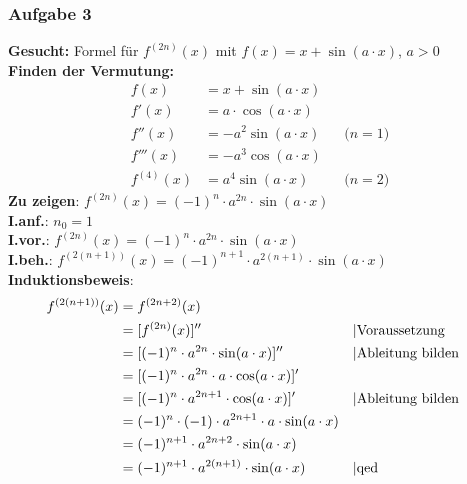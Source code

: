 \subsubsection{Aufgabe 3}
\textbf{Gesucht:} Formel für $ f^{(2n)}(x) $ mit $ f(x)=x+\sin(a\cdot x) $, $a>0$ \\
\textbf{Finden der Vermutung:}\begin{align*} 	
f(x) &= x+\sin(a\cdot x) \\
f'(x) &= a\cdot \cos(a\cdot x)\\
f''(x) &= -a^2\sin(a\cdot x)&&\text{($n=1$)}\\
f'''(x) &= -a^3 \cos(a\cdot x) \\
f^{(4)}(x) &= a^4\sin (a\cdot x)&&\text{($n=2$)}
\end{align*}
\textbf{Zu zeigen}: $ f^{(2n)}(x) = (-1)^{n} \cdot a^{2n} \cdot \sin (a \cdot x) $\\
\textbf{I.anf.}: $ n_0 = 1 $\\
\textbf{I.vor.}: $ f^{(2n)}(x) = (-1)^{n} \cdot a^{2n} \cdot \sin (a \cdot x) $\\
\textbf{I.beh.}: $ f^{(2(n+1))}(x) = (-1)^{n+1} \cdot a^{2(n+1)} \cdot \sin (a \cdot x) $\\
\textbf{Induktionsbeweis}:\begin{align*}
f^{(2(n+1))}(x) &= f^{(2n+2)}(x) \\
								&= [f^{(2n)}(x)]'' && \text{\textbar Voraussetzung}\\
								&= [(-1)^{n} \cdot a^{2n} \cdot \sin (a \cdot x)]''				&& \text{\textbar Ableitung bilden}\\
								&= [(-1)^{n} \cdot a^{2n} \cdot a \cdot \cos (a \cdot x)]' \\
								&= [(-1)^{n} \cdot a^{2n+1} \cdot \cos (a \cdot x)]' 		&& \text{\textbar Ableitung bilden}\\
								&= (-1)^{n} \cdot (-1) \cdot a^{2n+1} \cdot a \cdot \sin (a \cdot x) \\
								&= (-1)^{n+1} \cdot a^{2n+2} \cdot \sin (a \cdot x) \\
								&= (-1)^{n+1} \cdot a^{2(n+1)} \cdot \sin (a \cdot x) && \text{\textbar qed}\end{align*}
